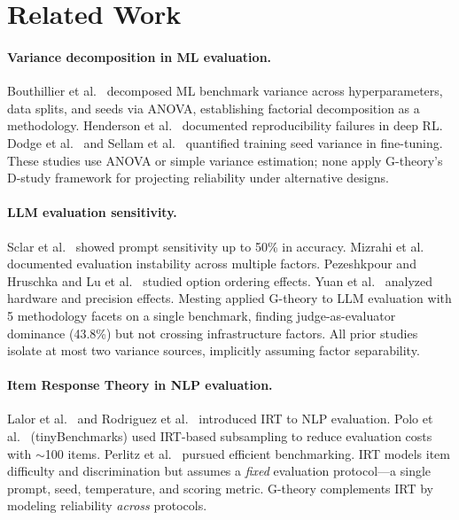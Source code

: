 \documentclass[11pt,twocolumn]{article}
\newcommand{\pct}{\%}
\begin{document}
\section{Related Work}

\paragraph{Variance decomposition in ML evaluation.}
Bouthillier et al.\  decomposed ML benchmark variance across hyperparameters, data splits, and seeds via ANOVA, establishing factorial decomposition as a methodology. Henderson et al.\  documented reproducibility failures in deep RL. Dodge et al.\  and Sellam et al.\  quantified training seed variance in fine-tuning. These studies use ANOVA or simple variance estimation; none apply G-theory's D-study framework for projecting reliability under alternative designs.

\paragraph{LLM evaluation sensitivity.}
Sclar et al.\  showed prompt sensitivity up to 50\pct{} in accuracy. Mizrahi et al.\  documented evaluation instability across multiple factors. Pezeshkpour and Hruschka  and Lu et al.\  studied option ordering effects. Yuan et al.\  analyzed hardware and precision effects. Mesting  applied G-theory to LLM evaluation with 5 methodology facets on a single benchmark, finding judge-as-evaluator dominance (43.8\pct{}) but not crossing infrastructure factors. All prior studies isolate at most two variance sources, implicitly assuming factor separability.

\paragraph{Item Response Theory in NLP evaluation.}
Lalor et al.\  and Rodriguez et al.\  introduced IRT to NLP evaluation. Polo et al.\  (tinyBenchmarks) used IRT-based subsampling to reduce evaluation costs with $\sim$100 items. Perlitz et al.\  pursued efficient benchmarking. IRT models item difficulty and discrimination but assumes a \emph{fixed} evaluation protocol---a single prompt, seed, temperature, and scoring metric. G-theory complements IRT by modeling reliability \emph{across} protocols.
\end{document}
